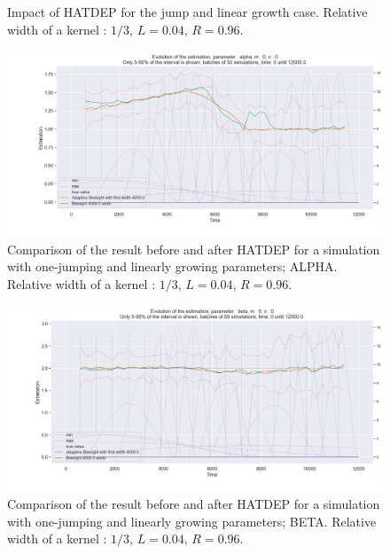 \begin{figure}
\centering
{} 
\caption{Impact of HATDEP for the jump and linear growth case. Relative width of a kernel : $1/3$, $L = 0.04$, $R = 0.96$.}
\label{fig:compar_kernels_3}
\end{figure}

\begin{figure}
\centering
\includegraphics[width = 0.90 \textwidth]{../imag/chap3/3/J.png}
\caption{Comparison of the result before and after HATDEP for a simulation with one-jumping and linearly growing parameters; ALPHA. Relative width of a kernel : $1/3$, $L = 0.04$, $R = 0.96$.}
\label{fig:first_estimate_3_alpha}
\end{figure}

\begin{figure}
\centering
\includegraphics[width = 0.90 \textwidth]{../imag/chap3/3/K.png}
\caption{Comparison of the result before and after HATDEP for a simulation with one-jumping and linearly growing parameters; BETA. Relative width of a kernel : $1/3$, $L = 0.04$, $R = 0.96$.}
\label{fig:first_estimate_3_beta}
\end{figure}

